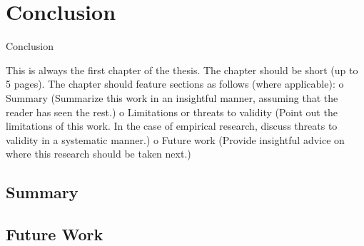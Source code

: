 \chapter{Conclusion}
\label{Conclusion}

Conclusion

This is always the first chapter of the thesis. The chapter should be short (up to 5 pages). The chapter should feature sections as follows (where applicable): o Summary (Summarize this work in an insightful manner, assuming that the reader has seen the rest.) o Limitations or threats to validity (Point out the limitations of this work. In the case of empirical research, discuss threats to validity in a systematic manner.) o Future work (Provide insightful advice on where this research should be taken next.)

\section{Summary}
\section{Future Work}